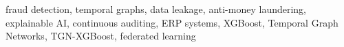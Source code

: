 \documentclass[journal]{IEEEtran}
\begin{document}
\begin{IEEEkeywords}
fraud detection, temporal graphs, data leakage, anti-money laundering, explainable AI, continuous auditing, ERP systems, XGBoost, Temporal Graph Networks, TGN-XGBoost, federated learning
\end{IEEEkeywords}








\end{document}
